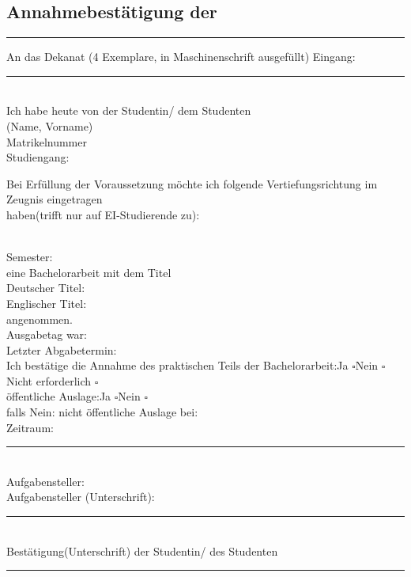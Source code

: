 \documentclass{abgabeOTH}
\newcommand{\mybox}{$\square$}
\begin{document}
\vspace*{.3cm}
\subsection*{Annahmebestätigung der \MaBaArbeit}
\vspace{-.3cm}
\noindent\rule[1ex]{\textwidth}{.5pt} %
    An das Dekanat (4 Exemplare, in Maschinenschrift ausgefüllt) \hfill Eingang:\rule{3cm}{.5pt}\\
    Ich habe heute von der Studentin/ dem Studenten\\
    (Name, Vorname)\hfill \Student\\
    Matrikelnummer \hfill \Matrikelnummer\\
    Studiengang:\hfill \Studiengang\\
    \raggedright Bei Erfüllung der Voraussetzung möchte ich folgende Vertiefungsrichtung im Zeugnis eingetragen\\
    haben(trifft nur auf EI-Studierende zu):\\
    \centering{{\Large \mybox} \small{AUT} \qquad  {\Large \mybox} \small{CPS} \qquad {\Large \mybox} \small{ENT} \qquad {\Large \mybox} \small{IKT}} \\
    \raggedright
    Semester:\quad \Semester\\
    eine Bachelorarbeit mit dem Titel\\
    Deutscher Titel:\quad \Titel\\
    Englischer Titel:\quad \TitelEnglisch\\
    angenommen.\\
    Ausgabetag war:\quad \Ausgabe\\
    Letzter Abgabetermin:\quad \Abgabe\\
    Ich bestätige die Annahme des praktischen Teils der Bachelorarbeit:\hfill Ja \mybox \qquad Nein \mybox \\
    \raggedleft Nicht erforderlich \mybox \\
    öffentliche Auslage:\hfill  Ja \mybox \qquad Nein \mybox\\
    falls Nein: nicht öffentliche Auslage bei:\hfill \Aufgabensteller \\
    \hfill Zeitraum:\rule{3cm}{0pt}\\
    Aufgabensteller:\hfill \Aufgabensteller\\
    Aufgabensteller (Unterschrift): \hfill \rule{.3\textwidth}{.5pt}\\
    Bestätigung(Unterschrift) der Studentin/ des Studenten\hfill \rule{.3\textwidth}{.5pt}
    \vspace*{.5cm}
    \raggedright

\end{document}
